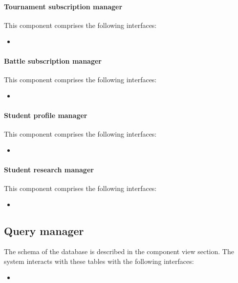 \documentclass[12pt, a4paper]{report}
\begin{document}
    \paragraph*{Tournament subscription manager}
    This component comprises the following interfaces: 
    \begin{itemize}
        \item 
    \end{itemize}

    \paragraph*{Battle subscription manager}
    This component comprises the following interfaces: 
    \begin{itemize}
        \item 
    \end{itemize}

    \paragraph*{Student profile manager}
    This component comprises the following interfaces: 
    \begin{itemize}
        \item 
    \end{itemize}

    \paragraph*{Student research manager}
    This component comprises the following interfaces: 
    \begin{itemize}
        \item 
    \end{itemize}

    \subsection{Query manager}
    The schema of the database is described in the component view section. 
    The system interacts with these tables with the following interfaces: 
    \begin{itemize}
        \item 
    \end{itemize}
\end{document}
